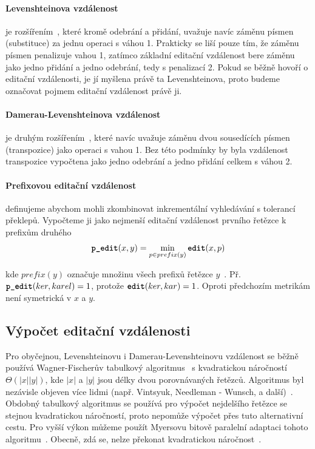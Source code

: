 \documentclass[11pt,letterpaper,oneside,openright]{book}
\newcommand{\bftt}[1]{\texttt{\textbf{#1}}}
\begin{document}
\paragraph{Levenshteinova vzdálenost} je rozšířením~\cite{Levenshtein66}, které
kromě odebrání a přidání, uvažuje navíc záměnu písmen (substituce) za jednu
operaci s váhou 1.  Prakticky se liší pouze tím, že záměnu písmen penalizuje
vahou 1, zatímco základní editační vzdálenost bere záměnu jako jedno přidání a
jedno odebrání, tedy s penalizací 2. Pokud se běžně hovoří o editační
vzdálenosti, je jí myšlena právě ta Levenshteinova, proto budeme označovat
pojmem editační vzdálenost právě ji.

\paragraph{Damerau-Levenshteinova vzdálenost} je druhým
rozšířením~\cite{Damerau:1964:TCD:363958.363994}, které navíc uvažuje záměnu
dvou sousedících písmen (transpozice) jako operaci s vahou 1. Bez této podmínky
by byla vzdálenost transpozice vypočtena jako jedno odebrání a jedno přidání
celkem s váhou 2.

\paragraph{Prefixovou editační vzdálenost} definujeme abychom mohli zkombinovat
inkrementální vyhledávání s tolerancí překlepů. Vypočteme ji jako nejmenší
editační vzdálenost prvního řetězce k prefixům druhého \[\bftt{p\_edit}(x, y) =
\min_{p \in prefix(y)} \bftt{edit}(x, p)\]

kde $prefix(y)$ označuje množinu všech prefixů řetězce
$y$~\cite{Bast:2013:EFS:2457465.2457470}. Př.  $\bftt{p\_edit}(ker, karel) =
1$, protože $\bftt{edit}(ker, kar) = 1$. Oproti předchozím metrikám není
symetrická v $x$ a $y$.


\subsection{Výpočet editační vzdálenosti}
Pro obyčejnou, Levenshteinovu i Damerau-Levenshteinovu vzdálenost se běžně
používá Wagner-Fischerův tabulkový
algoritmus~\cite{Wagner:1974:SCP:321796.321811} s kvadratickou náročností
$\Theta(|x||y|)$, kde $|x|$ a $|y|$ jsou délky dvou porovnávaných řetězců.
Algoritmus byl nezávisle objeven více lidmi (např.  Vintsyuk, Needleman -
Wunsch, a další)~\cite{Navarro:2001:GTA:375360.375365}.  Obdobný tabulkový
algoritmus se používá pro výpočet nejdelšího řetězce se stejnou kvadratickou
náročností, proto nepomůže výpočet přes tuto alternativní cestu. Pro vyšší
výkon můžeme použít Myersovu bitově paralelní adaptaci tohoto
algoritmu~\cite{Myers:1999:FBA:316542.316550}. Obecně, zdá se, nelze překonat
kvadratickou náročnost~\cite{Backurs:2015:EDC:2746539.2746612}.
\end{document}
